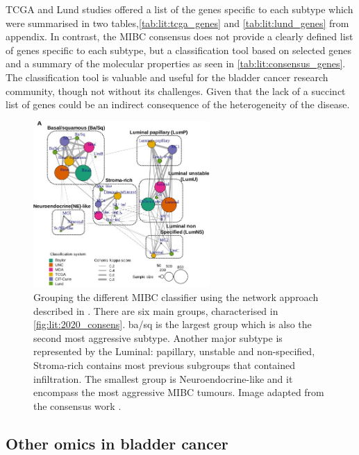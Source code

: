 TCGA and Lund studies offered a list of the genes specific to each subtype which were summarised in two tables,\cref{tab:lit:tcga_genes} and \cref{tab:lit:lund_genes} from appendix. In contrast, the MIBC consensus does not provide a clearly defined list of genes specific to each subtype, but a classification tool based on selected genes and a summary of the molecular properties as seen in \cref{tab:lit:consensus_genes}. The classification tool is valuable and useful for the bladder cancer research community, though not without its challenges. Given that the lack of a succinct list of genes could be an indirect consequence of the heterogeneity of the disease.


\begin{figure}[!htb]    
    \centering
\includegraphics[width=0.6\textwidth,height=0.6\textheight,keepaspectratio]{Sections/Lit_review/Resources/consensus_network_classifier.jpg}
    \caption{Grouping the different MIBC classifier using the network approach described in \cite{Guinney2015-fy}. There are six main groups, characterised in \cref{fig:lit:2020_consens}. \acrfull{ba/sq} is the largest group which is also the second most aggressive subtype. Another major subtype is represented by the Luminal: papillary, unstable and non-specified, Stroma-rich contains most previous subgroups that contained infiltration. The smallest group is Neuroendocrine-like and it encompass the most aggressive MIBC tumours. Image adapted from the consensus work \citet{Kamoun2020-tj}.}
    \label{fig:lit:consensus_network}
\end{figure}




\subsection{Other omics in bladder cancer} \label{s:lit:bladder_other}

